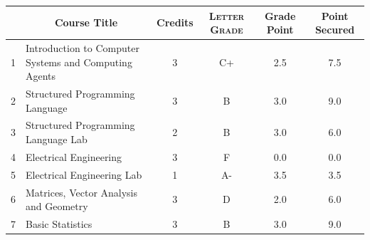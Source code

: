 \documentclass[11pt]{article}
\newcommand*{\numtwo}[1]{\pgfmathprintnumber[
                    fixed, precision=2, fixed zerofill=true]{#1}}
\begin{document}
                \begin{center}
                    \renewcommand{\arraystretch}{1.08}
                    
                \begin{tabular}{|c|l|c|>{\scshape}c|c|c|}
                \hline  \rule[-1ex]{0pt}{3.5ex} {\centering{\bf Course Code}} &  \multicolumn{1}{c|}{\textbf{Course Title}}  & {\bf Credits} & {\bf Letter Grade} & {\bf Grade Point} & {\bf Point Secured}  \\ 
                \hline   1 &  Introduction to Computer Systems and Computing Agents		 & 3 & C+ & 2.5 & 7.5 \\ %
                \hline   2 &  Structured Programming Language		 & 3 & B & 3.0 & 9.0 \\ %
                \hline   3 &  Structured Programming Language Lab		 & 2 & B & 3.0 & 6.0 \\ %
                \hline   4 &  Electrical Engineering		 & 3 & F & 0.0 & 0.0 \\ %
                \hline   5 &  Electrical Engineering Lab		 & 1 & A- & 3.5 & 3.5 \\ %
                \hline   6 &  Matrices, Vector Analysis and Geometry		 & 3 & D & 2.0 & 6.0 \\ %
                \hline   7 &  Basic Statistics		 & 3 & B & 3.0 & 9.0 \\ %

\hline                %
                \end{tabular}
                \end{center}
                \renewcommand{\arraystretch}{1.03}
\end{document}
